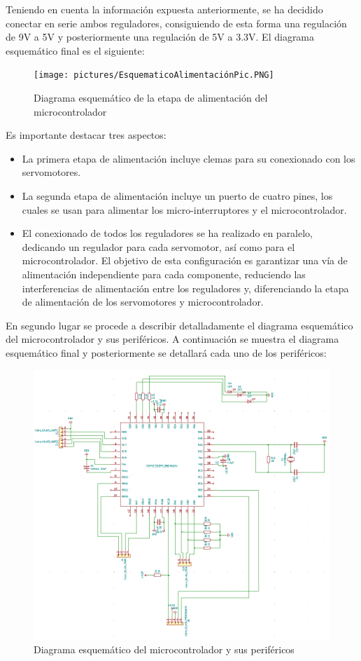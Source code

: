 Teniendo en cuenta la información expuesta anteriormente, se ha decidido conectar en serie ambos reguladores, consiguiendo de esta forma una regulación de 9V a 5V y posteriormente una regulación de 5V a 3.3V. El diagrama esquemático final es el siguiente:

    \begin{figure}[H]
    \centering 
    \texttt{[image: pictures/EsquematicoAlimentaciónPic.PNG]}
    \caption{Diagrama esquemático de la etapa de alimentación del microcontrolador}
    \label{fig:kdiagram}
    \end{figure}

Es importante destacar tres aspectos:
\begin{itemize}
    \item La primera etapa de alimentación incluye clemas para su conexionado con los servomotores.
    \item La segunda etapa de alimentación incluye un puerto de cuatro pines, los cuales se usan para alimentar los micro-interruptores y el microcontrolador.
    \item El conexionado de todos los reguladores se ha realizado en paralelo, dedicando un regulador para cada servomotor, así como para el microcontrolador. El objetivo de esta configuración es garantizar una vía de alimentación independiente para cada componente, reduciendo las interferencias de alimentación entre los reguladores y, diferenciando la etapa de alimentación de los servomotores y microcontrolador.
\end{itemize}

En segundo lugar se procede a describir detalladamente el diagrama esquemático del microcontrolador y sus periféricos. A continuación se muestra el diagrama esquemático final y posteriormente se detallará cada uno de los periféricos:

\begin{figure}[H]
    \centering 
    \includegraphics[width=.95\linewidth]{pictures/EsquematicoMicrocontrolador.PNG}
    \caption{Diagrama esquemático del microcontrolador y sus periféricos}
    \label{fig:kdiagram}
\end{figure}

